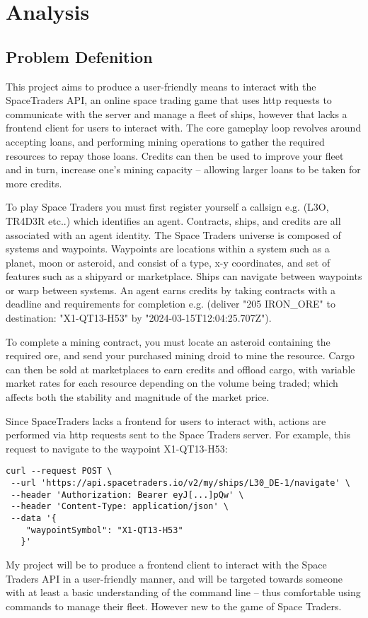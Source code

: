 \section{Analysis}
\subsection{Problem Defenition}
This project aims to produce a user-friendly means to interact with the SpaceTraders API, an online space trading game that uses http requests to communicate with the server and manage a fleet of ships, however that lacks a frontend client for users to interact with. The core gameplay loop revolves around accepting loans, and performing mining operations to gather the required resources to repay those loans. Credits can then be used to improve your fleet and in turn, increase one's mining capacity – allowing larger loans to be taken for more credits.

To play Space Traders you must first register yourself a callsign e.g. (L3O, TR4D3R etc..) which identifies an agent. Contracts, ships, and credits are all associated with an agent identity. The Space Traders universe is composed of systems and waypoints. Waypoints are locations within a system such as a planet, moon or asteroid, and consist of a type, x-y coordinates, and set of features such as a shipyard or marketplace. Ships can navigate between waypoints or warp between systems. An agent earns credits by taking contracts with a deadline and requirements for completion e.g. (deliver "205 IRON\_ORE" to destination: "X1-QT13-H53" by "2024-03-15T12:04:25.707Z"). 

To complete a mining contract, you must locate an asteroid containing the required ore, and send your purchased mining droid to mine the resource. Cargo can then be sold at marketplaces to earn credits and offload cargo, with variable market rates for each resource depending on the volume being traded; which affects both the stability and magnitude of the market price. 

Since SpaceTraders lacks a frontend for users to interact with, actions are performed via http requests sent to the Space Traders server. For example, this request to navigate to the waypoint X1-QT13-H53:
\begin{lstlisting}
curl --request POST \
 --url 'https://api.spacetraders.io/v2/my/ships/L30_DE-1/navigate' \
 --header 'Authorization: Bearer eyJ[...]pQw' \
 --header 'Content-Type: application/json' \
 --data '{
    "waypointSymbol": "X1-QT13-H53"
   }'
\end{lstlisting}
My project will be to produce a frontend client to interact with the Space Traders API in a user-friendly manner, and will be targeted towards someone with at least a basic understanding of the command line – thus comfortable using commands to manage their fleet. However new to the game of Space Traders. 

